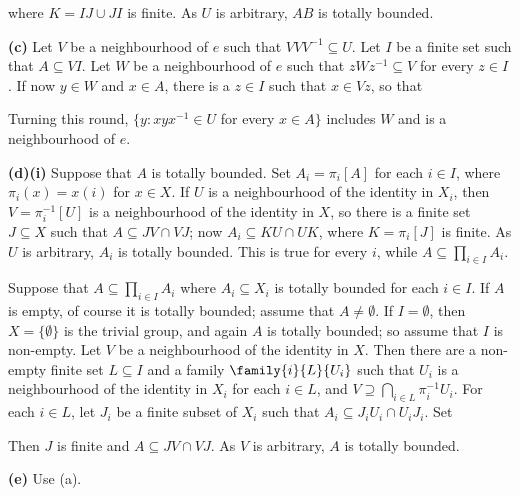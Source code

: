 {\noindent where $K=IJ\cup JI$ is finite.   As $U$ is arbitrary, $AB$ is
totally bounded.

\medskip

{\bf (c)} Let $V$ be a neighbourhood of $e$ such that $VVV^{-1}\subseteq
U$.   Let $I$ be a finite set such that $A\subseteq VI$.   Let $W$ be a
neighbourhood of $e$ such that $zWz^{-1}\subseteq V$ for every $z\in I$.
If now $y\in W$ and $x\in A$, there is a $z\in I$ such that $x\in Vz$,
so that


\noindent Turning this round, $\{y:xyx^{-1}\in U$ for every $x\in A\}$
includes $W$ and is a neighbourhood of $e$.

\medskip

{\bf (d)(i)} Suppose that $A$ is totally bounded.   Set
$A_i=\pi_i[A]$ for each $i\in I$, where $\pi_i(x)=x(i)$ for $x\in X$.
If $U$ is a neighbourhood of the identity in $X_i$, then
$V=\pi_i^{-1}[U]$ is a neighbourhood of the identity in $X$, so there is
a finite set $J\subseteq X$ such that $A\subseteq JV\cap VJ$;  now
$A_i\subseteq KU\cap UK$, where $K=\pi_i[J]$ is finite.   As $U$ is
arbitrary, $A_i$ is totally bounded.   This is true for every $i$, while
$A\subseteq\prod_{i\in I}A_i$.

\medskip

 Suppose that $A\subseteq\prod_{i\in I}A_i$ where
$A_i\subseteq X_i$ is totally bounded for each $i\in I$.   If $A$ is
empty, of course it is totally bounded;  assume that $A\ne\emptyset$.
If $I=\emptyset$, then $X=\{\emptyset\}$ is the trivial group, and again
$A$ is totally bounded;  so assume that $I$ is non-empty.    Let $V$ be
a neighbourhood of the identity in $X$.   Then there are a non-empty
finite set $L\subseteq I$ and a family $\family{i}{L}{U_i}$ such that
$U_i$ is a neighbourhood of the identity in $X_i$ for each $i\in L$, and
$V\supseteq\bigcap_{i\in L}\pi_i^{-1}U_i$.   For each $i\in L$, let
$J_i$ be a finite subset of $X_i$ such that $A_i\subseteq J_iU_i\cap
U_iJ_i$.   Set


\noindent Then $J$ is finite and $A\subseteq JV\cap VJ$.  As $V$ is
arbitrary, $A$ is totally bounded.

\medskip

{\bf (e)} Use (a).
}%

